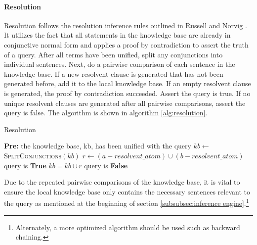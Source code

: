 \paragraph{Resolution}
Resolution follows the resolution inference rules outlined in Russell and Norvig \cite{Russell}. 
It utilizes the fact that all statements in the knowledge base are already in conjunctive normal form and applies a proof by contradiction to assert the truth of a query. 
After all terms have been unified, split any conjunctions into individual sentences. 
Next, do a pairwise comparison of each sentence in the knowledge base.
If a new resolvent clause is generated that has not been generated before, add it to the local knowledge base. 
If an empty resolvent clause is generated, the proof by contradiction succeeded. 
Assert the query is true.
If no unique resolvent clauses are generated after all pairwise comparisons, assert the query is false.
The algorithm is shown in algorithm \ref{alg:resolution}.
\begin{algorithm}
\caption{Resolution}\label{alg:resolution}
\begin{algorithmic}[1]
	\State \textbf{Pre:} the knowledge base, kb, has been unified with the query
    \State $kb \gets $ \textsc{SplitConjunctions}$(kb)$
    \Repeat
        	\State $r \gets (a-resolvent\_atom) \cup (b-resolvent\_atom)$
                    \State query is \textbf{True}
                \Else
                	\State $kb = kb \cup r$
                \EndIf
            \EndIf
        \EndFor
        	\State query is \textbf{False}
        \EndIf
\EndProcedure
\end{algorithmic}
\end{algorithm}

Due to the repeated pairwise comparisons of the knowledge base, it is vital to ensure the local knowledge base only contains the necessary sentences relevant to the query as mentioned at the beginning of section \ref{subsubsec:inference engine}.\footnote{Alternately, a more optimized algorithm should be used such as backward chaining.}

